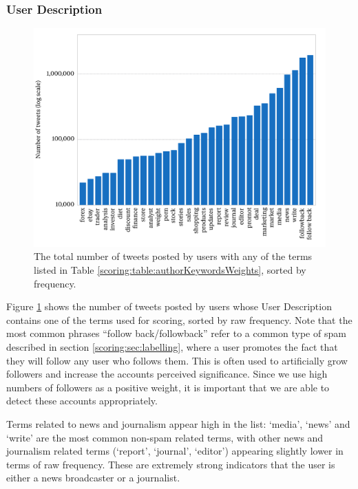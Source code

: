\subsubsection{User Description}
\begin{figure}[t!]
	\centering
	\includegraphics[width=\textwidth]{Chapters/Newsworthiness/data/descterms.pdf}
	\caption{The total number of tweets posted by users with any of the terms listed in Table \ref{scoring:table:authorKeywordsWeights}, sorted by frequency.}
	\label{scoring:graphic:descTerms}
 \end{figure}

Figure \ref{scoring:graphic:descTerms} shows the number of tweets posted by users whose User Description contains one of the terms used for scoring, sorted by raw frequency.
Note that the most common phrases  ``follow back/followback'' refer to a common type of spam described in section \ref{scoring:sec:labelling}, where a user promotes the fact that they will follow any user who follows them.
This is often used to artificially grow followers and increase the accounts perceived significance.
Since we use high numbers of followers as a positive weight, it is important that we are able to detect these accounts appropriately.

Terms related to news and journalism appear high in the list: `media', `news' and `write' are the most common non-spam related terms, with other news and journalism related terms (`report', `journal', `editor') appearing slightly lower in terms of raw frequency.
These are extremely strong indicators that the user is either a news broadcaster or a journalist.

